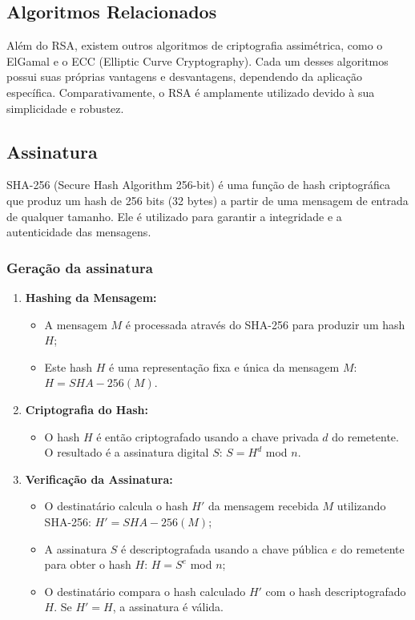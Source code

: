 \documentclass[a4paper,12pt]{article}
\begin{document}
\subsection*{Algoritmos Relacionados}
Além do RSA, existem outros algoritmos de criptografia assimétrica, como o ElGamal e o ECC (Elliptic Curve Cryptography). Cada um desses algoritmos possui suas próprias vantagens e desvantagens, dependendo da aplicação específica. Comparativamente, o RSA é amplamente utilizado devido à sua simplicidade e robustez.

\subsection*{Assinatura}
SHA-256 (Secure Hash Algorithm 256-bit) é uma função de hash criptográfica que produz um hash de 256 bits (32 bytes) a partir de uma mensagem de entrada de qualquer tamanho. Ele é utilizado para garantir a integridade e a autenticidade das mensagens.

\subsubsection*{Geração da assinatura}
\begin{enumerate}
    \item \textbf{Hashing da Mensagem:}
        \begin{itemize}
            \item A mensagem \(M\) é processada através do SHA-256 para produzir um hash \(H\);
            \item Este hash \(H\) é uma representação fixa e única da mensagem \(M\): \(H = SHA-256(M)\).
        \end{itemize}
    \item \textbf{Criptografia do Hash:}
        \begin{itemize}
            \item O hash \(H\) é então criptografado usando a chave privada \(d\) do remetente. O resultado é a assinatura digital \(S\): \(S = H^{d}\) mod \(n\).
        \end{itemize}
    \item \textbf{Verificação da Assinatura:}
        \begin{itemize}
            \item O destinatário calcula o hash \(H'\) da mensagem recebida \(M\) utilizando SHA-256: \(H' = SHA-256(M)\);
            \item A assinatura \(S\) é descriptografada usando a chave pública \(e\) do remetente para obter o hash \(H\): \(H = S^{e}\) mod \(n\);
            \item O destinatário compara o hash calculado \(H'\) com o hash descriptografado \(H\). Se \(H' = H\), a assinatura é válida.
        \end{itemize}
\end{enumerate}
\end{document}
